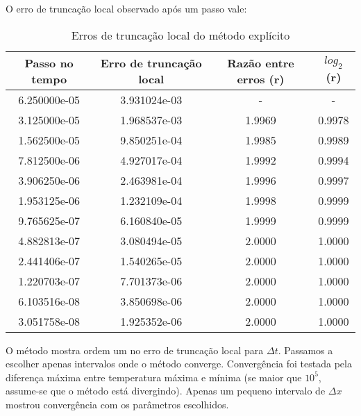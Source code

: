 \documentclass[12pt,fleqn]{article}
\begin{document}
O erro de truncação local observado após um passo vale:

\begin{table}[htb]
\begin{center}
		\begin{tabular}{|c|c|c|c|}\hline
			Passo no tempo & Erro de truncação local & Razão entre erros (r) & $log_2$(r) \\\hline
			6.250000e-05 & 3.931024e-03 & - & - \\\hline
			3.125000e-05 & 1.968537e-03 & 1.9969 & 0.9978\\\hline
			1.562500e-05 & 9.850251e-04 & 1.9985 & 0.9989 \\\hline
			7.812500e-06 & 4.927017e-04 & 1.9992 & 0.9994\\\hline
			3.906250e-06 & 2.463981e-04 & 1.9996 & 0.9997\\\hline
			1.953125e-06 & 1.232109e-04 & 1.9998 & 0.9999\\\hline
			9.765625e-07 & 6.160840e-05 & 1.9999 & 0.9999\\\hline
			4.882813e-07 & 3.080494e-05 & 2.0000 & 1.0000 \\\hline
			2.441406e-07 & 1.540265e-05 & 2.0000 & 1.0000 \\\hline
			1.220703e-07 & 7.701373e-06 & 2.0000 & 1.0000 \\\hline
			6.103516e-08 & 3.850698e-06 & 2.0000 & 1.0000 \\\hline
			3.051758e-08 & 1.925352e-06 & 2.0000 & 1.0000 \\\hline
		\end{tabular}
\caption{Erros de truncação local do método explícito}
\end{center}
\end{table}

O método mostra ordem um no erro de truncação local para $\Delta t$. Passamos a escolher apenas intervalos onde o método converge. Convergência foi testada pela diferença máxima entre temperatura máxima e mínima (se maior que $10^5$, assume-se que o método está divergindo). Apenas um pequeno intervalo de $\Delta x$ mostrou convergência com os parâmetros escolhidos.
\end{document}
